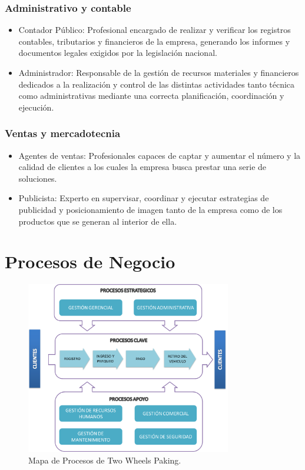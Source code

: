 \subsubsection{Administrativo y contable} 
\begin{itemize}
	\item Contador Público: Profesional encargado de realizar y verificar los registros contables, tributarios y financieros de la empresa, generando los informes y documentos legales exigidos por la legislación nacional.
	\item Administrador: Responsable de la gestión de recursos materiales y financieros dedicados a la realización y control de las distintas actividades tanto técnica como administrativas mediante una correcta planificación, coordinación y ejecución.
\end{itemize}

\subsubsection{Ventas y mercadotecnia}
\begin{itemize}
	\item Agentes de ventas: Profesionales capaces de captar y aumentar el número y la calidad de clientes a los cuales la empresa busca prestar una serie de soluciones.
	\item Publicista: Experto en supervisar, coordinar y ejecutar estrategias de publicidad y posicionamiento de imagen tanto de la empresa como de los productos que se generan al interior de ella.
\end{itemize}


\section{Procesos de Negocio}
\begin{figure}[H]
	\centering
	\includegraphics[width=0.8\textwidth]{imagenes/mapProcTWP}
	\caption{Mapa de Procesos de Two Wheels Paking.}
	\label{fig:awesome_image}
\end{figure}

